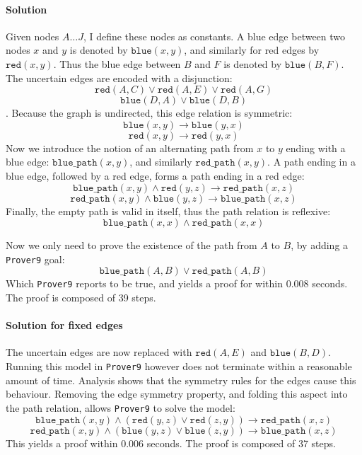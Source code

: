 \documentclass[12pt]{article}
\newcommand{\bimp}{\rightarrow}
\newcommand{\band}{\wedge}
\newcommand{\bor}{\vee}
\newcommand{\provernine}{\texttt{Prover9}\xspace}
\newcommand{\blue}[2]{\mathtt{blue}(#1, #2)}
\newcommand{\red}[2]{\mathtt{red}(#1, #2)}
\newcommand{\bluep}[2]{\mathtt{blue\_path}(#1, #2)}
\newcommand{\redp}[2]{\mathtt{red\_path}(#1, #2)}
\begin{document}
\paragraph{Solution}
Given nodes $A \ldots J$, I define these nodes as constants.
A blue edge between two nodes $x$ and $y$ is denoted by $\blue{x}{y}$,
and similarly for red edges by $\red{x}{y}$.
Thus the blue edge between $B$ and $F$ is denoted by $\blue{B}{F}$.
The uncertain edges are encoded with a disjunction:
\[ \red{A}{C} \bor \red{A}{E} \bor \red{A}{G} \]
\[ \blue{D}{A} \bor \blue{D}{B} \].
Because the graph is undirected, this edge relation is symmetric:
\[ \blue{x}{y} \bimp \blue{y}{x} \]
\[ \red{x}{y} \bimp \red{y}{x} \]
Now we introduce the notion of an alternating path from $x$ to $y$ ending with a blue edge:
$\bluep{x}{y}$, and similarly $\redp{x}{y}$.
A path ending in a blue edge, followed by a red edge, forms a path ending in a red edge:
\[ \bluep{x}{y} \band \red{y}{z} \bimp \redp{x}{z} \]
\[ \redp{x}{y} \band \blue{y}{z} \bimp \bluep{x}{z} \]
Finally, the empty path is valid in itself, thus the path relation is reflexive:
\[ \bluep{x}{x} \band \redp{x}{x} \]

Now we only need to prove the existence of the path from $A$ to $B$, by adding
a \provernine goal:
\[ \bluep{A}{B} \bor \redp{A}{B} \]
Which \provernine reports to be true, and yields a proof for within 0.008 seconds.
The proof is composed of 39 steps.

\paragraph{Solution for fixed edges}
The uncertain edges are now replaced with $\red{A}{E}$ and $\blue{B}{D}$.
Running this model in \provernine however does not terminate within a reasonable amount of time.
Analysis shows that the symmetry rules for the edges cause this behaviour.
Removing the edge symmetry property, and folding this aspect into the path relation,
allows \provernine to solve the model:
\[ \bluep{x}{y} \band (\red{y}{z} \bor \red{z}{y}) \bimp \redp{x}{z} \]
\[ \redp{x}{y} \band (\blue{y}{z} \bor \blue{z}{y}) \bimp \bluep{x}{z} \]
This yields a proof within 0.006 seconds.
The proof is composed of 37 steps.
\end{document}
